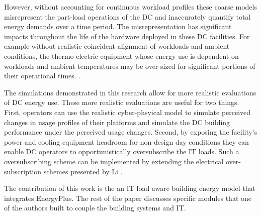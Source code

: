 
However, without accounting for continuous workload profiles these coarse models misrepresent the part-load operations of the DC and inaccurately quantify total energy demands over a time period. The misrepresentation has significant impacts throughout the life of the hardware deployed in these DC facilities. For example without realistic coincident alignment of workloads and ambient conditions, the thermo-electric equipment whose energy use is dependent on workloads and ambient temperatures may be over-sized for significant portions of their operational times. . 

The simulations demonstrated in this research allow for more realistic evaluations of DC energy use. These more realistic evaluations are useful for two things. First, operators can use the realistic cyber-phsyical model to simulate perceived changes in usage profiles of their platforms and simulate the DC building performance under the perceived usage changes. Second, by exposing the facility's power and cooling equipment headroom for non-design day conditions they can enable DC operators to opportunistically oversubscribe the IT loads. Such a oversubscribing scheme can be implemented by extending the electrical over-subscription  schemes presented by Li \citep{Li18} .

The contribution of this work is the  an IT load aware building energy model that integrates   EnergyPlus.  The rest of the paper discusses specific modules that one of the authors built to couple the building systems and IT. 

